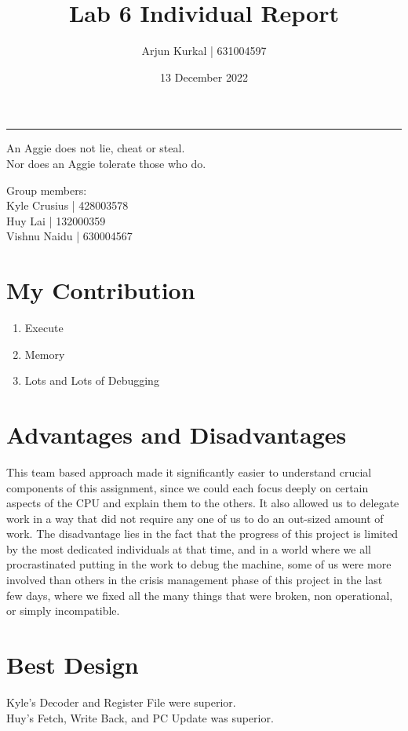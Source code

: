 \documentclass[fleqn,12pt]{article}
\title{\vspace{-2.5cm}Lab 6 Individual Report}
\author{
    Arjun Kurkal | 631004597
}
\affil{Texas A\&M University}
\date{\vspace{-28pt}13 December 2022}
\begin{document}
\maketitle
\begin{center}
\vspace{-42pt}
\rule{\textwidth}{.1pt}
{\large
An Aggie does not lie, cheat or steal.\\
Nor does an Aggie tolerate those who do.
}
\end{center}
\begin{center}
Group members:\\
Kyle Crusius | 428003578\\
Huy Lai | 132000359\\
Vishnu Naidu | 630004567
\end{center}

\section*{My Contribution}
\begin{enumerate}
    \item Execute
    \item Memory
    \item Lots and Lots of Debugging
\end{enumerate}

\section*{Advantages and Disadvantages}
This team based approach made it significantly easier to understand crucial components of this assignment, since we could each focus deeply on certain aspects of the CPU and explain them to the others.  It also allowed us to delegate work in a way that did not require any one of us to do an out-sized amount of work.  The disadvantage lies in the fact that the progress of this project is limited by the most dedicated individuals at that time, and in a world where we all procrastinated putting in the work to debug the machine, some of us were more involved than others in the crisis management phase of this project in the last few days, where we fixed all the many things that were broken, non operational, or simply incompatible.

\section*{Best Design}
Kyle’s Decoder and Register File were superior.\\
Huy's Fetch, Write Back, and PC Update was superior.
\end{document}

